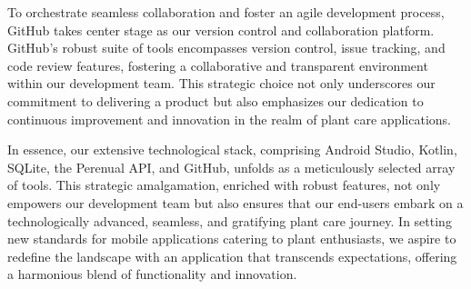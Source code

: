 \documentclass{sigchi}
\begin{document}
To orchestrate seamless collaboration and foster an agile development process, GitHub takes center stage as our version control and collaboration platform. GitHub's robust suite of tools encompasses version control, issue tracking, and code review features, fostering a collaborative and transparent environment within our development team. This strategic choice not only underscores our commitment to delivering a product but also emphasizes our dedication to continuous improvement and innovation in the realm of plant care applications.

In essence, our extensive technological stack, comprising Android Studio, Kotlin, SQLite, the Perenual API, and GitHub, unfolds as a meticulously selected array of tools. This strategic amalgamation, enriched with robust features, not only empowers our development team but also ensures that our end-users embark on a technologically advanced, seamless, and gratifying plant care journey. In setting new standards for mobile applications catering to plant enthusiasts, we aspire to redefine the landscape with an application that transcends expectations, offering a harmonious blend of functionality and innovation.

\end{document}
